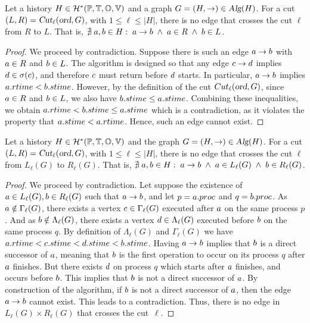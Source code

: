 

\begin{lemma}
Let a history $H\in\mathcal{H}^*(\mathbb{P}, \mathbb{T}, \mathbb{O}, \mathbb{V})$ and a graph \mbox{$G=(H,\rightarrow)\in\textsl{Alg}(H)$}. For a cut 
\mbox{$(L,R)=\textsl{Cut}_\ell(\textsl{ord},G)$}, with \mbox{$1\leq\ell\leq|H|$}, there is no edge that crosses the cut $\ell$ from $R$ to $L$. That is, $\nexists\; a,b\in H:\; a\rightarrow b\;\land\;a\in R\;\land\;b\in L$.
\end{lemma}

\begin{proof}
We proceed by contradiction. Suppose there is such an edge $ a\rightarrow b$ with $a\in R$ and $b\in L$. The algorithm is designed so that any edge $c\rightarrow d$ implies $d\in\sigma(c)$, and therefore $c$ must return before $d$ starts. In particular, $a\rightarrow b$ implies $a.rtime<b.stime$.
However, by the definition of the cut $Cut_\ell(\textsl{ord},G)$, since $a\in R$ and $b\in L$, we also have \mbox{$b.stime\leq a.stime$}. Combining these inequalities, we obtain \mbox{$a.rtime<b.stime\leq a.stime$} which is a contradiction, as it violates the property that $a.stime<a.rtime$. Hence, such an edge cannot exist.
\end{proof}



\begin{lemma}
Let a history $H\in\mathcal{H}^*(\mathbb{P}, \mathbb{T}, \mathbb{O}, \mathbb{V})$ and the graph \mbox{$G=(H,\rightarrow)\in\textsl{Alg}(H)$}. For a cut 
\mbox{$(L,R)=\textsl{Cut}_\ell(\textsl{ord},G)$}, with \mbox{$1\leq\ell\leq|H|$}, there is no edge that crosses the cut $\ell$ from $L_\ell(G)$ to $R_\ell(G)$. That is, \mbox{$\nexists\; a,b\in H:\; a\rightarrow b\;\land\;a\in L_\ell(G)\;\land\;b\in R_\ell(G)$}.
\end{lemma}
\begin{proof}
We proceed by contradiction. Let suppose the existence of $a\in L_\ell(G),b\in R_\ell(G)$ such that $a\rightarrow	b$, and let $p=a.proc$ and $q=b.proc$. 
As $a\notin \Gamma_\ell(G)$, there exists a vertex $c\in \Gamma_\ell(G)$ executed after $a$ on the same process $p$ . And as $b\notin \Lambda_\ell(G)$, there exists a vertex $d\in \Lambda_\ell(G)$ executed before $b$ on the same process $q$. By definition of $\Lambda_\ell(G)$ and $\Gamma_\ell(G)$ we have $a.rtime<c.stime<d.stime<b.stime$.
Having $a\rightarrow b$ implies that $b$ is a direct successor of $a$, meaning that $b$ is the first operation to occur on its process $q$ after $a$ finishes. But there exists $d$ on process $q$ which starts after $a$ finishes, and occurs before $b$. This implies that $b$ is not a direct successor of $a$. By construction of the algorithm, if $b$ is not a direct successor of $a$, then the edge $a\rightarrow b$ cannot exist. This leads to a contradiction.
Thus, there is no edge in $L_\ell(G)\times R_\ell(G)$ that crosses the cut~$\ell$.
\end{proof}

